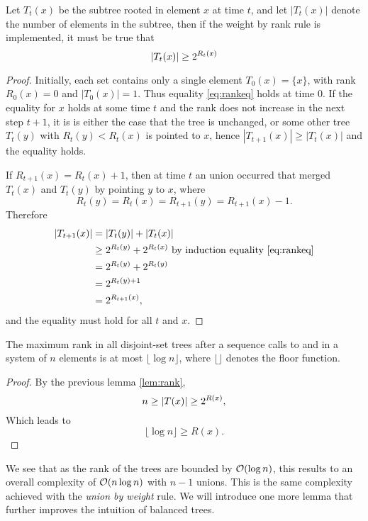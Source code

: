 \begin{lemma}\label{lem:rank}
  Let $T_t(x)$ be the subtree rooted in element $x$ at time $t$, and let $|T_t(x)|$ denote the number of elements in the subtree, then if the weight by rank rule is implemented, it must be true that 
  \begin{equation}\label{eq:rankeq}
    \abs{T_t(x)} \geq 2^{R_t(x)}
  \end{equation}
\end{lemma}
\begin{proof}
  Initially, each set contains only a single element $T_0(x) = \{x\}$, with rank $R_0(x)=0$ and $|T_0(x)|=1$. Thus equality \ref{eq:rankeq} holds at time $0$. If the equality for $x$ holds at some time $t$ and the rank does not increase in the next step $t+1$, it is is either the case that the tree is unchanged, or some other tree $T_t(y)$ with $R_t(y)<R_t(x)$ is pointed to $x$, hence $|T_{t+1}(x)| \geq  |T_t(x)|$ and the equality holds. 
  
  If $R_{t+1}(x) = R_t(x) + 1$, then at time $t$ an union occurred that merged $T_t(x)$ and $T_t(y)$ by pointing $y$ to $x$, where
  \begin{equation*}
    R_t(y) = R_t(x) = R_{t+1}(y) = R_{t+1}(x) - 1.
  \end{equation*}
  Therefore
  \begin{align*}
    \abs{T_{t+1}(x)} &= \abs{T_t(y)} + \abs{T_t(x)} \\
      &\geq 2^{R_t(y)} + 2^{R_t(x)} \text{ by induction equality \ref{eq:rankeq}} \\
      &= 2^{R_t(y)} + 2^{R_t(y)} \\
      &= 2^{R_t(y)+1} \\
      &= 2^{R_{t+1}(x)},
  \end{align*}
  and the equality must hold for all $t$ and $x$. 
\end{proof}
\begin{lemma}\label{lem:maxrank}
    The maximum rank in all disjoint-set trees after a sequence calls to  and  in a system of $n$ elements is at most $\lfloor \log n \rfloor$, where $\lfloor \rfloor$ denotes the floor function. 
\end{lemma}
\begin{proof}
    By the previous lemma \ref{lem:rank}, 
    \begin{equation*}
        n \geq \abs{T(x)} \geq 2^{R(x)}, 
    \end{equation*}
    Which leads to 
    \begin{equation*}
        \lfloor \log n \rfloor \geq R(x).
    \end{equation*}
\end{proof}
We see that as the rank of the trees are bounded by $\mathcal{O}(\log n)$, this results to an overall complexity of $\mathcal{O}(n\log n)$ with $n-1$ unions. This is the same complexity achieved with the \emph{union by weight} rule. We will introduce one more lemma that further improves the intuition of balanced trees. 

